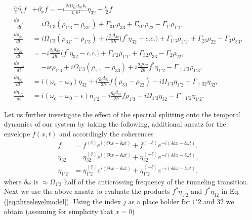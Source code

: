 \documentclass[]{spie}  %
\def\dw{\delta\omega}
\def\dk{\delta k}
\begin{document}
\begin{subequations}
	\label{eq:threelevelmodel}
	\begin{align}
	\frac{n}{c}\partial_t f &+ \partial_{x}f= -i\frac{N \Gamma q_0d_{32} k_c}{\epsilon_0 n^2} \eta_{32} - \frac{l_0}{2} f \label{eq:rtwave} \\
	\frac{d \rho_{1'1'}}{d t} 	&= i\Omega_{1'3} (\rho_{1'3} - \rho_{31'})+ \Gamma_{31'}\rho_{33} + \Gamma_{21'}\rho_{22}  -\Gamma_{1'}\rho_{1'1'} \\
	\frac{d \rho_{33}}{d t}	& = i\Omega_{1'3} (\rho_{31'} - \rho_{1'3}) + i\frac{q_0d_{32}}{2\hbar} \big (f^*\eta_{32}- c.c. \big ) 
	+\Gamma_{1'3}\rho_{1'1'} + \Gamma_{23}\rho_{22} - \Gamma_3 \rho_{33},  \\
	\frac{d \rho_{22}}{d t}  &= -i\frac{q_0d_{32}}{2\hbar} \big (f^*\eta_{32} - c.c. \big )  + \Gamma_{1'2}\rho_{1'1'}  +  \Gamma_{32}\rho_{33} - \Gamma_{2}\rho_{22} , \\
	\frac{d \rho_{1'3}}{d t}  &= -i\epsilon\rho_{1'3} +i \Omega_{1'3}(\rho_{1'1'} - \rho_{33}) +i\frac{q_0d_{32}}{2 \hbar}f^*\eta_{1'2}- \Gamma_{\parallel 1'3} \rho_{1'3},  \\
	\frac{d \eta_{32}}{d t}   &= i(\omega_c - \omega_0)\eta_{32} + i \frac{q_0d_{32}}{2\hbar}f(\rho_{33}-\rho_{22})  - i\Omega_{1'3}\eta_{1'2} - \Gamma_{\parallel 32}\eta_{32}, \\
	\frac{d \eta_{1'2}}{d t} &= i(\omega_c - \omega_0-\epsilon)\eta_{1'2} +i \frac{q_0d_{32}}{2\hbar}f\rho_{1'3} - i\Omega_{1'3}\eta_{32} - \Gamma_{\parallel 1'2}\eta_{1'2}.
	\end{align}
\end{subequations}

Let us further investigate the effect of the spectral splitting onto the temporal dynamics of our system by taking the following, additional ansatz for the envelope $f(x,t)$ and accordingly the coherences
\begin{subequations}
	\begin{align}
	\label{eq:splittingAnsatz}
	f &= f^{(\delta)}e^{ i(\dk x -\dw t)} + f^{(-\delta)}e^{-i(\dk x -\dw t)}, \\
	\eta_{32} &= \eta_{32}^{(\delta)}e^{i(\dk x -\dw t)} + \eta_{32}^{(-\delta)}e^{-i(\dk x -\dw t)}, \\
	\eta_{1'2} &= \eta_{1'2}^{(\delta)}e^{i(\dk x -\dw t)} + \eta_{1'2}^{(-\delta)}e^{-i(\dk x -\dw t)},
	\end{align}
\end{subequations}
where $\delta\omega$ is $\approx \Omega_{1'3}$ half of the anticrossing frequency of the tunneling transition. Next we use the above ansatz to evaluate the products $f^*\eta_{1'2}$ and $f^*\eta_{32}$ in Eq. (\ref{eq:threelevelmodel}). Using the index $j$ as a place holder for $1'2$ and  $32$ we obtain (assuming for simplicity that $x = 0$)
\end{document}
